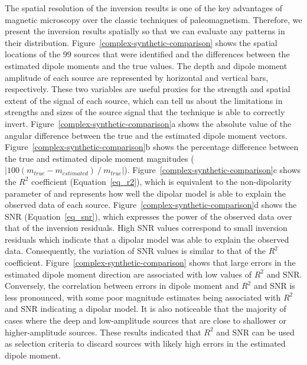 The spatial resolution of the inversion results is one of the key advantages of magnetic microscopy over the classic techniques of paleomagnetism.
Therefore, we present the inversion results spatially so that we can evaluate any patterns in their distribution.
Figure~\ref{complex-synthetic-comparison} shows the spatial locations of the 99 sources that were identified and the differences between the estimated dipole moments and the true values.
The depth and dipole moment amplitude of each source are represented by horizontal and vertical bars, respectively.
These two variables are useful proxies for the strength and spatial extent of the signal of each source,
which can tell us about the limitations in strengths and sizes of the source signal that the technique is able to correctly invert.
Figure~\ref{complex-synthetic-comparison}a shows the absolute value of the angular difference between the true and the estimated dipole moment vectors.
Figure~\ref{complex-synthetic-comparison}b shows the percentage difference between the true and estimated dipole moment magnitudes ($|100 \left( m_{true} - m_{estimated}\right) ~/~ m_{true}|$).
Figure~\ref{complex-synthetic-comparison}c shows the $R^2$ coefficient (Equation~\ref{eq_r2}), which is equivalent to the non-dipolarity parameter of \citet{Fu2020} and represents how well the dipolar model is able to explain the observed data of each source.
Figure~\ref{complex-synthetic-comparison}d shows the SNR (Equation~\ref{eq_snr}), which expresses the power of the observed data over that of the inversion residuals.
High SNR values correspond to small inversion residuals which indicate that a dipolar model was able to explain the observed data.
Consequently, the variation of SNR values is similar to that of the $R^2$ coefficient.
Figure~\ref{complex-synthetic-comparison} shows that large errors in the estimated dipole moment direction are associated with low values of $R^2$ and SNR.
Conversely, the correlation between errors in dipole moment \DIFdelbegin {}\DIFdelend \DIFaddbegin {}\DIFaddend and $R^2$ and SNR is less pronounced, with some poor magnitude estimates being associated with $R^2$ and SNR indicating a \DIFdelbegin {}\DIFdelend \DIFaddbegin {}\DIFaddend dipolar model.
It is also noticeable that the majority of cases where the \DIFdelbegin {}\DIFdelend \DIFaddbegin {}\DIFaddend deep and low-amplitude sources that are close to shallower or higher-amplitude sources.
These results indicated that $R^2$ and SNR can be used as selection criteria to discard sources with likely high errors in the estimated dipole moment.

